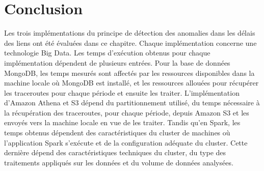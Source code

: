 \section{Conclusion}

Les trois implémentations du principe de détection des anomalies dans les délais des liens ont été évaluées dans ce chapitre. Chaque implémentation  concerne une technologie Big Data. Les temps d'exécution obtenus pour chaque implémentation dépendent de plusieurs entrées. Pour la base de données  MongoDB, les temps  mesurés sont affectés par les ressources disponibles dans la machine locale où MongoDB est installé, et les ressources allouées pour récupérer les traceroutes pour chaque période et ensuite les traiter. L'implémentation d'Amazon Athena et S3 dépend du partitionnement utilisé, du temps nécessaire à la récupération des traceroutes, pour chaque période,  depuis Amazon S3 et les envoyés vers la machine locale en vue de les traiter. Tandis qu'en Spark, les temps obtenus dépendent des caractéristiques du cluster de machines où l'application Spark s'exécute et de la configuration adéquate du cluster. Cette dernière dépend des caractéristiques techniques du cluster, du type des traitements appliqués sur les données et du volume de données   analysées.












